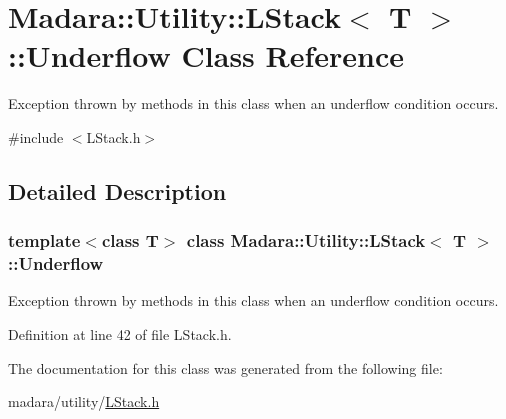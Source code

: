 \hypertarget{classMadara_1_1Utility_1_1LStack_1_1Underflow}{
\section{Madara::Utility::LStack$<$ T $>$::Underflow Class Reference}
\label{d9/dfd/classMadara_1_1Utility_1_1LStack_1_1Underflow}
}


Exception thrown by methods in this class when an underflow condition occurs.  




{\ttfamily \#include $<$LStack.h$>$}



\subsection{Detailed Description}
\subsubsection*{template$<$class T$>$ class Madara::Utility::LStack$<$ T $>$::Underflow}

Exception thrown by methods in this class when an underflow condition occurs. 

Definition at line 42 of file LStack.h.



The documentation for this class was generated from the following file:\begin{DoxyCompactItemize}
\item 
madara/utility/\hyperlink{LStack_8h}{LStack.h}\end{DoxyCompactItemize}

